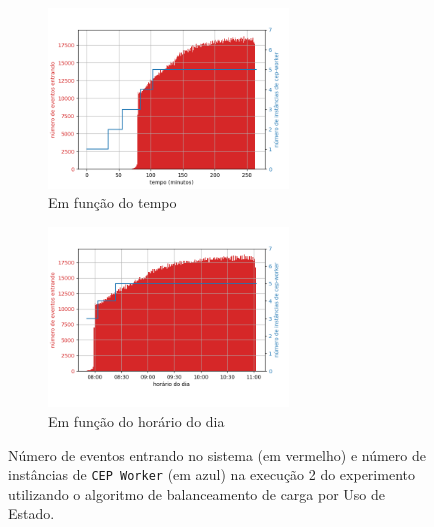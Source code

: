 \begin{figure}[h]
\centering
\begin{subfigure}{\textwidth}
\centering
\includegraphics[width=0.7\textwidth]{figuras/graphics/carga_e_workers_total7-dez-su.png}
\caption{Em função do tempo}
\label{fig:workers_and_load_total_7-dez-su}
\end{subfigure}%

\begin{subfigure}{\textwidth}
\centering
\includegraphics[width=0.7\textwidth]{figuras/graphics/carga_e_workers_horario7-dez-su.png}
\caption{Em função do horário do dia }
\label{fig:workers_and_load_SPtrans_7-dez-su}
\end{subfigure}%
\caption{Número de eventos entrando no sistema (em vermelho) e número de instâncias de \texttt{CEP Worker} (em azul) na execução 2 do experimento utilizando o algoritmo de balanceamento de carga por Uso de Estado.}
\end{figure}





